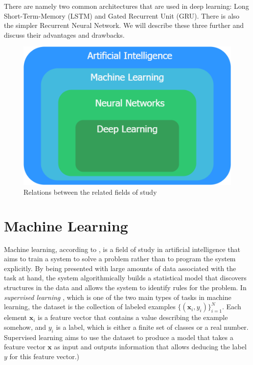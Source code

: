 \documentclass[nofilelist]{cslthse-msc}
\begin{document}
There are namely two common architectures \citep{staudemeyer2019understanding} that are used in deep learning: Long Short-Term-Memory (LSTM) and Gated Recurrent Unit (GRU). There is also the simpler \citep{Sherstinsky_2020} Recurrent Neural Network. We will describe these three further and discuss their advantages and drawbacks. 


\begin{figure}[h!]
    \centering
    \includegraphics[scale=0.4]{msccls/explanatory_images/map_of_techniques.png}
    \caption{Relations between the related fields of study }
    \label{fig:map}
\end{figure}

\section{Machine Learning}
\label{sect:ml}
Machine learning, according to \citet{franoischollet2017learning}, is a field of study in artificial intelligence that aims to train a system to solve a problem rather than to program the system explicitly. By being presented with large amounts of data associated with the task at hand, the system algorithmically builds a statistical model that discovers structures in the data and allows the system to identify rules for the problem. 
In \textit{supervised learning} \citep{100pageBurkov}, which is one of the two main types of tasks in machine learning, the dataset is the collection of labeled examples $\{(\mathbf{x}_i, y_i)\}_{i=1}^N.$ Each element $\mathbf{x}_i$ is a feature vector that contains a value describing the example somehow, and $y_i$ is a label, which is either a finite set of classes or a real number. Supervised learning aims to use the dataset to produce a model that takes a feature vector $\mathbf{x}$ as input and outputs information that allows deducing the label $y$ for this feature vector.) 
\end{document}
